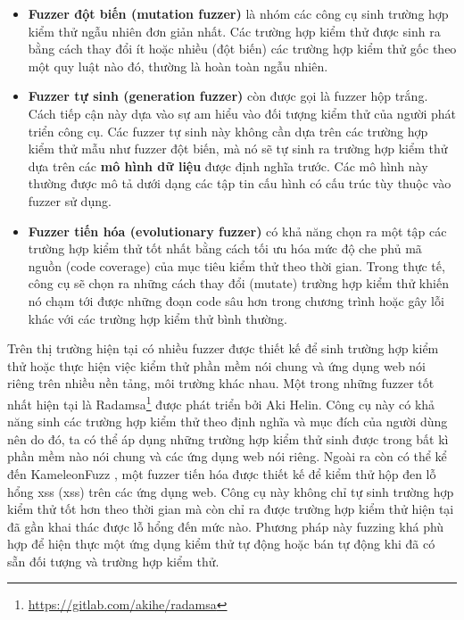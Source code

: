\begin{itemize}
    \item \textbf{Fuzzer đột biến (mutation fuzzer)} là nhóm các công cụ sinh trường hợp kiểm thử ngẫu nhiên đơn giản nhất. Các trường hợp kiểm thử được sinh ra bằng cách thay đổi ít hoặc nhiều (đột biến) các trường hợp kiểm thử gốc theo một quy luật nào đó, thường là hoàn toàn ngẫu nhiên.
    \item \textbf{Fuzzer tự sinh (generation fuzzer)} còn được gọi là fuzzer hộp trắng. Cách tiếp cận này dựa vào sự am hiểu vào đối tượng kiểm thử của người phát triển công cụ. Các fuzzer tự sinh này không cần dựa trên các trường hợp kiểm thử mẫu như fuzzer đột biến, mà nó sẽ tự sinh ra trường hợp kiểm thử dựa trên các \textbf{mô hình dữ liệu} được định nghĩa trước. Các mô hình này thường được mô tả dưới dạng các tập tin cấu hình có cấu trúc tùy thuộc vào fuzzer sử dụng.
    \item \textbf{Fuzzer tiến hóa (evolutionary fuzzer)} có khả năng chọn ra một tập các trường hợp kiểm thử tốt nhất bằng cách tối ưu hóa mức độ che phủ mã nguồn (code coverage) của mục tiêu kiểm thử theo thời gian. Trong thực tế, công cụ sẽ chọn ra những cách thay đổi (mutate) trường hợp kiểm thử khiến nó chạm tới được những đoạn code sâu hơn trong chương trình hoặc gây lỗi khác với các trường hợp kiểm thử bình thường.
\end{itemize}
Trên thị trường hiện tại có nhiều fuzzer được thiết kế để sinh trường hợp kiểm thử hoặc thực hiện việc kiểm thử phần mềm nói chung và ứng dụng web nói riêng trên nhiều nền tảng, môi trường khác nhau. Một trong những fuzzer tốt nhất hiện tại là Radamsa\footnote{\href{https://gitlab.com/akihe/radamsa}{https://gitlab.com/akihe/radamsa}} được phát triển bởi Aki Helin. Công cụ này có khả năng sinh các trường hợp kiểm thử theo định nghĩa và mục đích của người dùng nên do đó, ta có thể áp dụng những trường hợp kiểm thử sinh được trong bất kì phần mềm nào nói chung và các ứng dụng web nói riêng. Ngoài ra còn có thể kể đến KameleonFuzz \parencite{KameleonFuzz}, một fuzzer tiến hóa được thiết kế để kiểm thử hộp đen lỗ hổng \acrshort{xss} (\acrlong{xss}) trên các ứng dụng web. Công cụ này không chỉ tự sinh trường hợp kiểm thử tốt hơn theo thời gian mà còn chỉ ra được trường hợp kiểm thử hiện tại đã gần khai thác được lỗ hổng đến mức nào. Phương pháp này fuzzing khá phù hợp để hiện thực một ứng dụng kiểm thử tự động hoặc bán tự động khi đã có sẵn đối tượng và trường hợp kiểm thử.